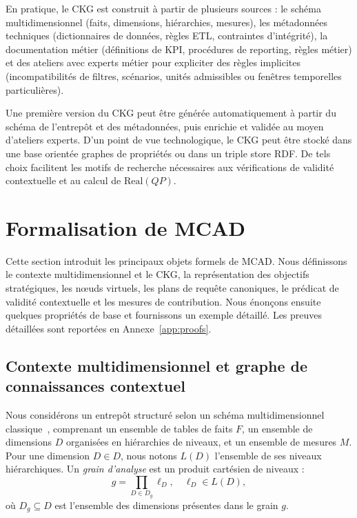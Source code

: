 \documentclass[journal]{IEEEtran}
\begin{document}
En pratique, le CKG est construit à partir de plusieurs sources : le schéma multidimensionnel (faits, dimensions, hiérarchies, mesures), les métadonnées techniques (dictionnaires de données, règles ETL, contraintes d'intégrité), la documentation métier (définitions de KPI, procédures de reporting, règles métier) et des ateliers avec experts métier pour expliciter des règles implicites (incompatibilités de filtres, scénarios, unités admissibles ou fenêtres temporelles particulières).

Une première version du CKG peut être générée automatiquement à partir du schéma de l'entrepôt et des métadonnées, puis enrichie et validée au moyen d'ateliers experts. D'un point de vue technologique, le CKG peut être stocké dans une base orientée graphes de propriétés ou dans un triple store RDF. De tels choix facilitent les motifs de recherche nécessaires aux vérifications de validité contextuelle et au calcul de $\mathrm{Real}(QP)$.

\section{Formalisation de MCAD}
\label{sec:formal}

Cette section introduit les principaux objets formels de MCAD. Nous définissons le contexte multidimensionnel et le CKG, la représentation des objectifs stratégiques, les nœuds virtuels, les plans de requête canoniques, le prédicat de validité contextuelle et les mesures de contribution. Nous énonçons ensuite quelques propriétés de base et fournissons un exemple détaillé. Les preuves détaillées sont reportées en Annexe~\ref{app:proofs}.

\subsection{Contexte multidimensionnel et graphe de connaissances contextuel}

Nous considérons un entrepôt structuré selon un schéma multidimensionnel classique~\cite{ChaudhuriDayal97,KimballRoss2013}, comprenant un ensemble de tables de faits $F$, un ensemble de dimensions $D$ organisées en hiérarchies de niveaux, et un ensemble de mesures $M$. Pour une dimension $D\in D$, nous notons $L(D)$ l'ensemble de ses niveaux hiérarchiques. Un \emph{grain d'analyse} est un produit cartésien de niveaux :
\[
g = \prod_{D\in D_g} \ell_D,\quad \ell_D\in L(D),
\]
où $D_g\subseteq D$ est l'ensemble des dimensions présentes dans le grain $g$.
\end{document}
